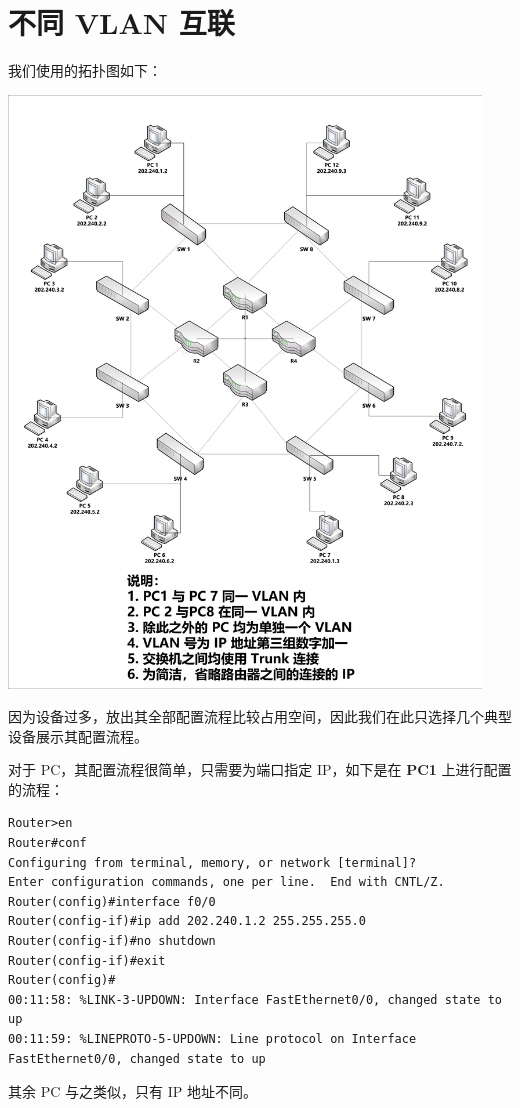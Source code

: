 \documentclass[black,normal,cn]{elegantnote}
\begin{document}
\section{不同 VLAN 互联}

我们使用的拓扑图如下：

\includegraphics[width=0.94\textwidth]{top}

因为设备过多，放出其全部配置流程比较占用空间，因此我们在此只选择几个典型设备展示其配置流程。

对于 PC，其配置流程很简单，只需要为端口指定 IP，如下是在 \textbf{PC1} 上进行配置的流程：
\begin{lstlisting}
Router>en
Router#conf
Configuring from terminal, memory, or network [terminal]?
Enter configuration commands, one per line.  End with CNTL/Z.
Router(config)#interface f0/0
Router(config-if)#ip add 202.240.1.2 255.255.255.0
Router(config-if)#no shutdown
Router(config-if)#exit
Router(config)#
00:11:58: %LINK-3-UPDOWN: Interface FastEthernet0/0, changed state to up
00:11:59: %LINEPROTO-5-UPDOWN: Line protocol on Interface FastEthernet0/0, changed state to up
\end{lstlisting}
其余 PC 与之类似，只有 IP 地址不同。
\end{document}
